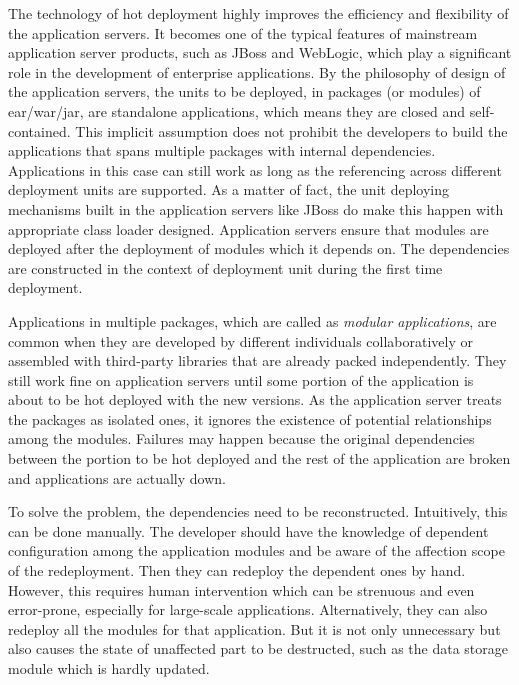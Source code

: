 \documentclass[conference]{IEEEtran}
\begin{document}
The technology of hot deployment highly improves the efficiency and flexibility of the application servers.
It becomes one of the typical features of mainstream application server products, such as JBoss\cite{jboss} and WebLogic\cite{weblogic}, which play a significant role in the development of enterprise applications. By the philosophy of design of the application servers, the units to be deployed, in packages (or modules) of ear/war/jar, are standalone applications, which means they are closed and self-contained. This implicit assumption does not prohibit the developers to build the applications that spans multiple packages with internal dependencies. Applications in this case can still work as long as the referencing across different deployment units are supported. As a matter of fact, the unit deploying mechanisms built in the application servers like JBoss do make this happen with appropriate class loader designed. Application servers ensure that modules are deployed after the deployment of modules which it depends on. The dependencies are constructed in the context of deployment unit during the first time deployment.

Applications in multiple packages, which are called as \emph{modular applications}, are common when they are developed by different individuals collaboratively or assembled with third-party libraries that are already packed independently. They still work fine on application servers until some portion of the application is about to be hot deployed  with the new versions. As the application server treats the packages as isolated ones, it ignores the existence of potential relationships among the modules. Failures may happen because the original dependencies between the portion to be hot deployed and the rest of the application are broken and applications are actually down.

To solve the problem, the dependencies need to be reconstructed. Intuitively, this can be done manually. The developer should have the knowledge of dependent configuration among the application modules and be aware of the affection scope of the redeployment. Then they can redeploy the dependent ones by hand. However, this requires human intervention which can be strenuous and even error-prone, especially for large-scale applications. Alternatively, they can also redeploy all the modules for that application. But it is not only unnecessary but also causes the state of unaffected part to be destructed, such as the data storage module which is hardly updated. 
\end{document}
